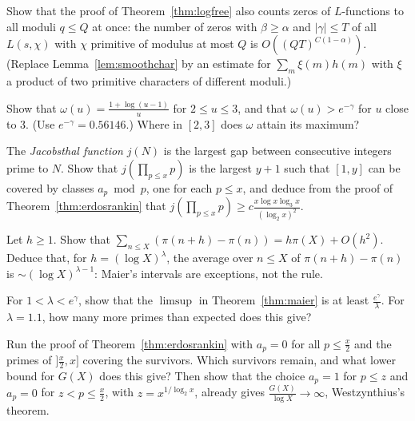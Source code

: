 \begin{exercise}[$\star\star\star$]\label{ex:density}
Show that the proof of Theorem~\ref{thm:logfree} also counts zeros of $L$-functions to all moduli $q\le Q$ at once: the number of zeros with $\beta\ge\alpha$ and $|\gamma|\le T$ of all $L(s,\chi)$ with $\chi$ primitive of modulus at most $Q$ is $O((QT)^{C(1-\alpha)})$. (Replace Lemma~\ref{lem:smoothchar} by an estimate for $\sum_m\xi(m)h(m)$ with $\xi$ a product of two primitive characters of different moduli.)
\end{exercise}

\begin{exercise}[$\star$]\label{ex:omega23}
Show that $\omega(u)=\frac{1+\log(u-1)}u$ for $2\le u\le3$, and that $\omega(u)>e^{-\gamma}$ for $u$ close to $3$. (Use $e^{-\gamma}=0.56146$.) Where in $[2,3]$ does $\omega$ attain its maximum?
\end{exercise}

\begin{exercise}[$\star\star$]\label{ex:jacobsthal}
The \emph{Jacobsthal function} $j(N)$ is the largest gap between consecutive integers prime to $N$. Show that $j(\prod_{p\le x}p)$ is the largest $y+1$ such that $[1,y]$ can be covered by classes $a_p\bmod p$, one for each $p\le x$, and deduce from the proof of Theorem~\ref{thm:erdosrankin} that $j(\prod_{p\le x}p)\ge c\frac{x\log x\log_3x}{(\log_2x)^2}$.
\end{exercise}

\begin{exercise}[$\star$]\label{ex:averageshort}
Let $h\ge1$. Show that $\sum_{n\le X}(\pi(n+h)-\pi(n))=h\pi(X)+O(h^2)$. Deduce that, for $h=(\log X)^\lambda$, the average over $n\le X$ of $\pi(n+h)-\pi(n)$ is $\sim(\log X)^{\lambda-1}$: Maier's intervals are exceptions, not the rule.
\end{exercise}

\begin{exercise}[$\star\star$]\label{ex:maierconst}
For $1<\lambda<e^\gamma$, show that the $\limsup$ in Theorem~\ref{thm:maier} is at least $\frac{e^\gamma}\lambda$. For $\lambda=1.1$, how many more primes than expected does this give?
\end{exercise}

\begin{exercise}[$\star\star$]\label{ex:westzynthius}
Run the proof of Theorem~\ref{thm:erdosrankin} with $a_p=0$ for all $p\le\frac x2$ and the primes of $]\frac x2,x]$ covering the survivors. Which survivors remain, and what lower bound for $G(X)$ does this give? Then show that the choice $a_p=1$ for $p\le z$ and $a_p=0$ for $z<p\le\frac x2$, with $z=x^{1/\log_2x}$, already gives $\frac{G(X)}{\log X}\to\infty$, Westzynthius's theorem.
\end{exercise}

